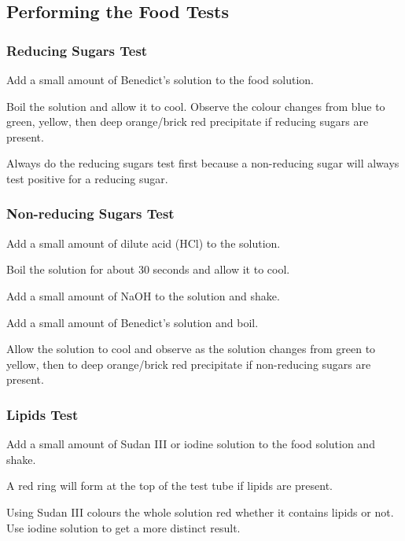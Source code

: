 \subsection{Performing the Food Tests}

\subsubsection{Reducing Sugars Test}
\begin{itemize*}
\item Add a small amount of Benedict's solution to the food solution. 
\item Boil the solution and allow it to cool. Observe the colour changes from blue to green, yellow, then deep orange\slash brick red precipitate if reducing sugars are present.
\end{itemize*}
Always do the reducing sugars test first because a non-reducing sugar will always test positive for a reducing sugar.

\subsubsection{Non-reducing Sugars Test}
\begin{itemize*}
\item Add a small amount of dilute acid (HCl) to the solution. 
\item Boil the solution for about 30 seconds and allow it to cool. 
\item Add a small amount of NaOH to the solution and shake.
\item Add a small amount of Benedict's solution and boil. 
\item Allow the solution to cool and observe as the solution changes from green to yellow, then to deep orange\slash brick red precipitate if non-reducing sugars are present.
\end{itemize*}

\subsubsection{Lipids Test}
\begin{itemize*}
\item Add a small amount of Sudan III or iodine solution to the food solution and shake. 
\item A red ring will form at the top of the test tube if lipids are present.
\end{itemize*}
Using Sudan III colours the whole solution red whether it contains lipids or not. Use iodine solution to get a more distinct result.

